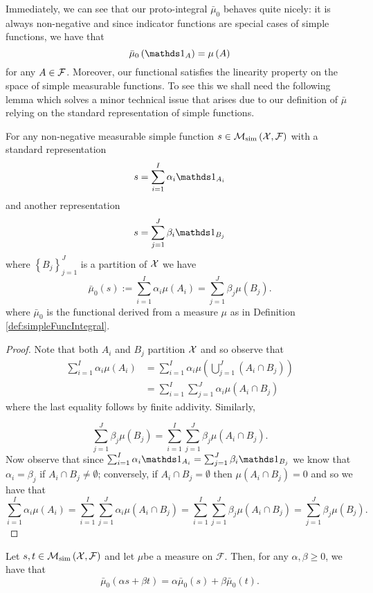 Immediately, we can see that our proto-integral $\bar{\mu}_{0}$ behaves
quite nicely: it is always non-negative and since indicator functions
are special cases of simple functions, we have that 
\[
\bar{\mu}_{0}\left(\indicate_{A}\right)=\mu\left(A\right)
\]
for any $A\in\mathcal{F}$. Moreover, our functional satisfies the linearity
property on the space of simple measurable functions. To see this
we shall need the following lemma which solves a minor technical issue
that arises due to our definition of $\bar{\mu}$ relying on the standard
representation of simple functions.
\begin{lem}
\label{lem:lebIntDiffRep}For any non-negative measurable simple function
$s\in\mathcal{M}_{\textnormal{sim}}\left(\mathcal{X},\mathcal{F}\right)$ with a standard
representation
\[
s=\sum_{i=1}^{I}\alpha_{i}\indicate_{A_{i}}
\]
and another representation
\[
s=\sum_{j=1}^{J}\beta_{i}\indicate_{B_{j}}
\]
where $\left\{ B_{j}\right\} _{j=1}^{J}$ is a partition of $\mathcal{X}$
we have 
\[
\bar{\mu}_{0}\left(s\right):=\sum_{i=1}^{I}\alpha_{i}\mu\left(A_{i}\right)=\sum_{j=1}^{J}\beta_{j}\mu\left(B_{j}\right).
\]
where $\bar{\mu}_{0}$ is the functional derived from a measure $\mu$
as in Definition \ref{def:simpleFuncIntegral}.
\end{lem}

\begin{proof}
Note that both $A_{i}$ and $B_{j}$ partition $\mathcal{X}$ and so observe
that
\begin{align*}
\sum_{i=1}^{I}\alpha_{i}\mu\left(A_{i}\right) & =\sum_{i=1}^{I}\alpha_{i}\mu\left(\bigcup_{j=1}^{J}\left(A_{i}\cap B_{j}\right)\right)\\
 & =\sum_{i=1}^{I}\sum_{j=1}^{J}\alpha_{i}\mu\left(A_{i}\cap B_{j}\right)
\end{align*}
where the last equality follows by finite addivity. Similarly,

\[
\sum_{j=1}^{J}\beta_{j}\mu\left(B_{j}\right)=\sum_{i=1}^{I}\sum_{j=1}^{J}\beta_{j}\mu\left(A_{i}\cap B_{j}\right).
\]
Now observe that since $\sum_{i=1}^{I}\alpha_{i}\indicate_{A_{i}}=\sum_{j=1}^{J}\beta_{i}\indicate_{B_{j}}$
we know that $\alpha_{i}=\beta_{j}$ if $A_{i}\cap B_{j}\neq\emptyset$;
conversely, if $A_{i}\cap B_{j}=\emptyset$ then $\mu\left(A_{i}\cap B_{j}\right)=0$
and so we have that 
\[
\sum_{i=1}^{I}\alpha_{i}\mu\left(A_{i}\right)=\sum_{i=1}^{I}\sum_{j=1}^{J}\alpha_{i}\mu\left(A_{i}\cap B_{j}\right)=\sum_{i=1}^{I}\sum_{j=1}^{J}\beta_{j}\mu\left(A_{i}\cap B_{j}\right)=\sum_{j=1}^{J}\beta_{j}\mu\left(B_{j}\right).
\]
\end{proof}
\begin{prop}
\label{prop:lebIntLinearitySimpleFunc}Let $s,t\in\mathcal{M}_{\textnormal{sim}}\left(\mathcal{X},\mathcal{F}\right)$
and let $\mu$be a measure on $\mathcal{F}$. Then, for any $\alpha,\beta\geq0$,
we have that
\[
\bar{\mu}_{0}\left(\alpha s+\beta t\right)=\alpha\bar{\mu}_{0}\left(s\right)+\beta\bar{\mu}_{0}\left(t\right).
\]
\end{prop}

